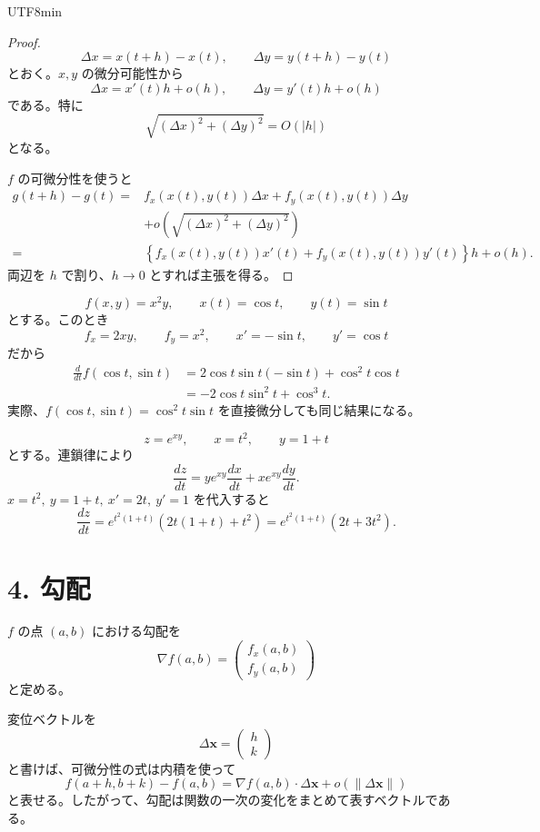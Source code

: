 \documentclass[a4paper,12pt]{article}
\begin{document}
\begin{CJK}{UTF8}{min}
\begin{proof}
\[
\Delta x=x(t+h)-x(t),\qquad
\Delta y=y(t+h)-y(t)
\]
とおく。$x,y$ の微分可能性から
\[
\Delta x=x'(t)h+o(h),\qquad
\Delta y=y'(t)h+o(h)
\]
である。特に
\[
\sqrt{(\Delta x)^2+(\Delta y)^2}=O(|h|)
\]
となる。

$f$ の可微分性を使うと
\[
\begin{aligned}
g(t+h)-g(t)
={}&f_x(x(t),y(t))\Delta x
+f_y(x(t),y(t))\Delta y\\
&+o\left(\sqrt{(\Delta x)^2+(\Delta y)^2}\right)\\
={}&\left\{
f_x(x(t),y(t))x'(t)
+f_y(x(t),y(t))y'(t)
\right\}h+o(h).
\end{aligned}
\]
両辺を $h$ で割り、$h\to0$ とすれば主張を得る。
\end{proof}

\begin{example}
\[
f(x,y)=x^2y,\qquad x(t)=\cos t,\qquad y(t)=\sin t
\]
とする。このとき
\[
f_x=2xy,\qquad f_y=x^2,\qquad
x'=-\sin t,\qquad y'=\cos t
\]
だから
\[
\begin{aligned}
\frac{d}{dt}f(\cos t,\sin t)
&=2\cos t\sin t(-\sin t)+\cos^2t\cos t\\
&=-2\cos t\sin^2t+\cos^3t.
\end{aligned}
\]
実際、$f(\cos t,\sin t)=\cos^2t\sin t$ を直接微分しても同じ結果になる。
\end{example}

\begin{example}
\[
z=e^{xy},\qquad x=t^2,\qquad y=1+t
\]
とする。連鎖律により
\[
\frac{dz}{dt}
=ye^{xy}\frac{dx}{dt}+xe^{xy}\frac{dy}{dt}.
\]
$x=t^2,\ y=1+t,\ x'=2t,\ y'=1$ を代入すると
\[
\frac{dz}{dt}
=e^{t^2(1+t)}\left(2t(1+t)+t^2\right)
=e^{t^2(1+t)}(2t+3t^2).
\]
\end{example}

\section*{4. 勾配}

\begin{definition}
$f$ の点 $(a,b)$ における勾配を
\[
\nabla f(a,b)
=\begin{pmatrix}
f_x(a,b)\\
f_y(a,b)
\end{pmatrix}
\]
と定める。
\end{definition}

変位ベクトルを
\[
\Delta\boldsymbol{x}
=\begin{pmatrix}h\\k\end{pmatrix}
\]
と書けば、可微分性の式は内積を使って
\[
f(a+h,b+k)-f(a,b)
=\nabla f(a,b)\cdot\Delta\boldsymbol{x}
+o(\|\Delta\boldsymbol{x}\|)
\]
と表せる。したがって、勾配は関数の一次の変化をまとめて表すベクトルである。


\end{CJK}
\end{document}
